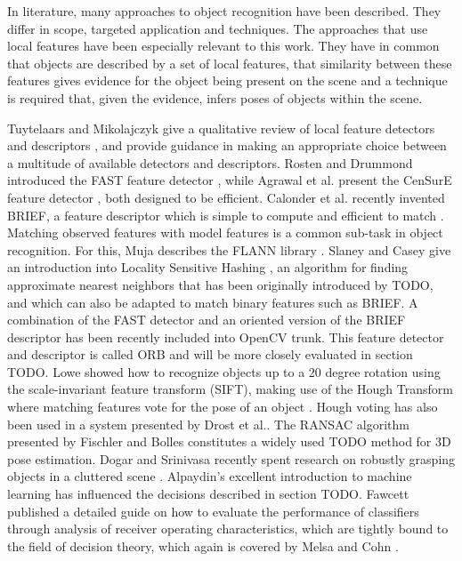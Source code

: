 In literature, many approaches to object recognition have been described. They
differ in scope, targeted application and techniques. The approaches that use
local features have been especially relevant to this work. They have in common
that objects are described by a set of local features, that similarity between
these features gives evidence for the object being present on the scene and a
technique is required that, given the evidence, infers poses of objects within
the scene.

Tuytelaars and Mikolajczyk give a qualitative review of local feature detectors
and descriptors \cite{Tuytelaars2007}, and provide guidance in making an
appropriate choice between a multitude of available detectors and descriptors.
Rosten and Drummond introduced the FAST feature detector \cite{Rosten2006},
while Agrawal et al. present the CenSurE feature detector \cite{Agrawal2008},
both designed to be efficient. Calonder et al. recently invented BRIEF, a
feature descriptor which is simple to compute and efficient to match
\cite{Calonder2010}. Matching observed features with model features is a common
sub-task in object recognition. For this, Muja describes the FLANN library
\cite{Muja2009}. Slaney and Casey give an introduction into Locality Sensitive
Hashing \cite{Slaney2008}, an algorithm for finding approximate nearest
neighbors that has been originally introduced by TODO, and which can also be
adapted to match binary features such as BRIEF. A combination of the FAST
detector and an oriented version of the BRIEF descriptor has been recently
included into OpenCV trunk. This feature detector and descriptor is called ORB
and will be more closely evaluated in section TODO. Lowe showed how to
recognize objects up to a 20 degree rotation using the scale-invariant feature
transform (SIFT), making use of the Hough Transform where matching features
vote for the pose of an object \cite{Lowe1999}. Hough voting has also been used
in a system presented by Drost et al.\cite{Drost2010}. The RANSAC algorithm
presented by Fischler and Bolles constitutes a widely used TODO method for 3D
pose estimation. Dogar and Srinivasa recently spent research on robustly
grasping objects in a cluttered scene \cite{Dogar2010}. Alpaydin's excellent
introduction to machine learning \cite{Alpaydin2010} has influenced the
decisions described in section TODO.  Fawcett \cite{Fawcett2006} published a
detailed guide on how to evaluate the performance of classifiers through
analysis of receiver operating characteristics, which are tightly bound to the
field of decision theory, which again is covered by Melsa and Cohn
\cite{Melsa1978}.

